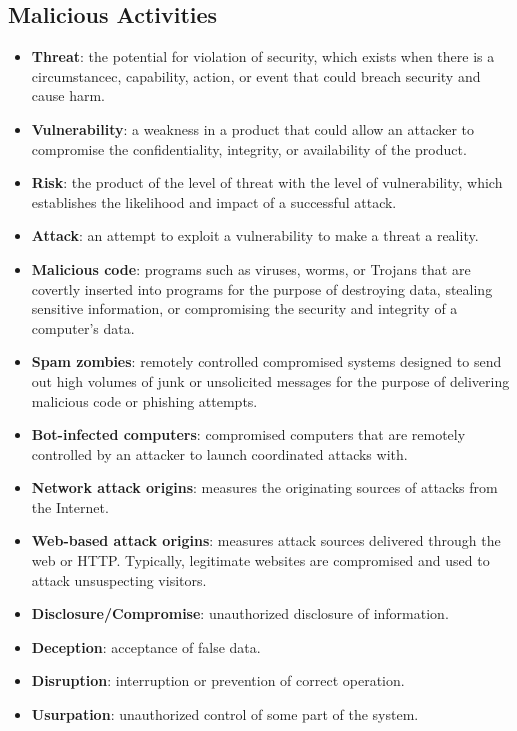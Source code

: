 \documentclass{math}
\begin{document}
\subsection*{Malicious Activities}
\begin{itemize}
  \item \textbf{Threat}: the potential for violation of security, which exists
    when there is a circumstancec, capability, action, or event that could
    breach security and cause harm.
  \item \textbf{Vulnerability}: a weakness in a product that could allow an
    attacker to compromise the confidentiality, integrity, or availability of
    the product.
  \item \textbf{Risk}: the product of the level of threat with the level of
    vulnerability, which establishes the likelihood and impact of a successful
    attack.
  \item \textbf{Attack}: an attempt to exploit a vulnerability to make a threat
    a reality.
  \item \textbf{Malicious code}: programs such as viruses, worms, or Trojans
    that are covertly inserted into programs for the purpose of destroying data,
    stealing sensitive information, or compromising the security and integrity
    of a computer's data.
  \item \textbf{Spam zombies}: remotely controlled compromised systems designed
    to send out high volumes of junk or unsolicited messages for the purpose
    of delivering malicious code or phishing attempts.
  \item \textbf{Bot-infected computers}: compromised computers that are
    remotely controlled by an attacker to launch coordinated attacks with.
  \item \textbf{Network attack origins}: measures the originating sources of
    attacks from the Internet.
  \item \textbf{Web-based attack origins}: measures attack sources delivered
    through the web or HTTP. Typically, legitimate websites are compromised and
    used to attack unsuspecting visitors.
  \item \textbf{Disclosure/Compromise}: unauthorized disclosure of information.
  \item \textbf{Deception}: acceptance of false data.
  \item \textbf{Disruption}: interruption or prevention of correct operation.
  \item \textbf{Usurpation}: unauthorized control of some part of the system.

\end{itemize}
\end{document}

